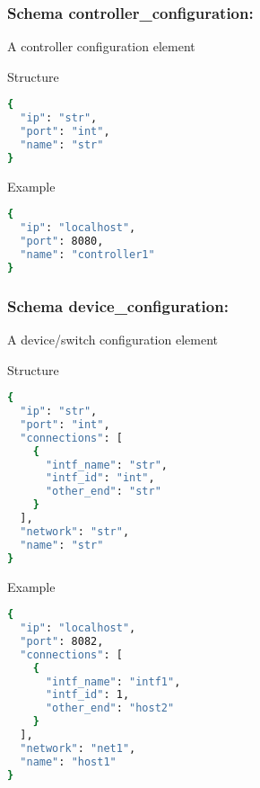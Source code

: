 \newpage
\subsubsection{Schema controller\_configuration:}
\label{dsmf_controller_configuration}
A controller configuration element
\begin{codes}
\item[Structure] \begin{lstlisting}[language=bash]
{
  "ip": "str",
  "port": "int",
  "name": "str"
}
\end{lstlisting}
\end{codes}
\begin{codes}
\item[Example] \begin{lstlisting}[language=bash]
{
  "ip": "localhost",
  "port": 8080,
  "name": "controller1"
}
\end{lstlisting}
\end{codes}

\newpage
\subsubsection{Schema device\_configuration:}
\label{dsmf_device_configuration}
A device/switch configuration element
\begin{codes}
\item[Structure] \begin{lstlisting}[language=bash]
{
  "ip": "str",
  "port": "int",
  "connections": [
    {
      "intf_name": "str",
      "intf_id": "int",
      "other_end": "str"
    }
  ],
  "network": "str",
  "name": "str"
}
\end{lstlisting}
\end{codes}
\begin{codes}
\item[Example] \begin{lstlisting}[language=bash]
{
  "ip": "localhost",
  "port": 8082,
  "connections": [
    {
      "intf_name": "intf1",
      "intf_id": 1,
      "other_end": "host2"
    }
  ],
  "network": "net1",
  "name": "host1"
}
\end{lstlisting}
\end{codes}

\newpage
